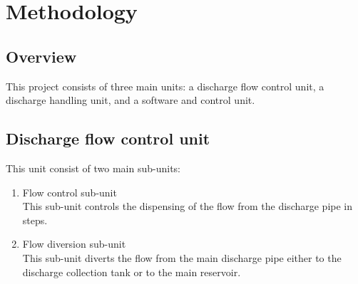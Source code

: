 \section{Methodology}
\subsection{Overview}
This project consists of three main units: a discharge flow control unit, a discharge handling  unit, and a software and control unit. 
\subsection{Discharge flow control unit}
This unit consist of two main sub-units:
\begin{enumerate}
    \item Flow control sub-unit\\
    This sub-unit controls the dispensing of the flow from the discharge pipe in steps.
    \item Flow diversion sub-unit\\
    This sub-unit diverts the flow from the main discharge pipe either to the discharge collection tank or to the main reservoir.
\end{enumerate}
\par
